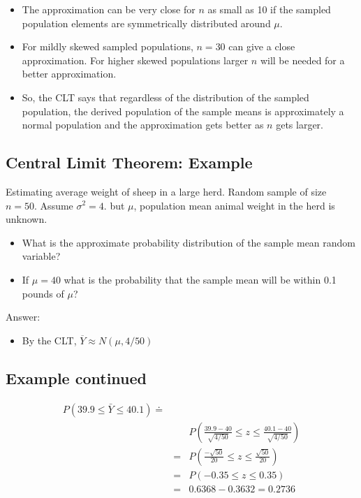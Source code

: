 \documentclass[
  letterpaper,
  DIV=11,
  numbers=noendperiod]{scrartcl}
\providecommand{\tightlist}{%
  \setlength{\itemsep}{0pt}\setlength{\parskip}{0pt}}\usepackage{longtable,booktabs,array}
\begin{document}
\begin{itemize}
\item
  The approximation can be very close for \(n\) as small as 10 if the
  sampled population elements are symmetrically distributed around
  \(\mu\).
\item
  For mildly skewed sampled populations, \(n=30\) can give a close
  approximation. For higher skewed populations larger \(n\) will be
  needed for a better approximation.
\item
  So, the CLT says that regardless of the distribution of the sampled
  population, the derived population of the sample means is
  approximately a normal population and the approximation gets better as
  \(n\) gets larger.
\end{itemize}

\subsection{Central Limit Theorem:
Example}\label{central-limit-theorem-example}

Estimating average weight of sheep in a large herd. Random sample of
size \(n=50\). Assume \(\sigma^2=4\). but \(\mu\), population mean
animal weight in the herd is unknown.

\begin{itemize}
\item
  What is the approximate probability distribution of the sample mean
  random variable?
\item
  If \(\mu=40\) what is the probability that the sample mean will be
  within 0.1 pounds of \(\mu\)?
\end{itemize}

Answer:

\begin{itemize}
\tightlist
\item
  By the CLT, \(\overline{Y} \approx N (\mu, 4/50)\)
\end{itemize}

\subsection{Example continued}\label{example-continued}

\[\begin{eqnarray*}
  {P(39.9 \leq \bar{Y} \leq 40.1)  \doteq }\\[.1in]
  & & P\left(\frac{39.9-40}{\sqrt{4/50}}\right. 
   \left.\leq z \leq \frac{40.1-40}{\sqrt{4/50}}\right) \\[.2in]
     & = & P\left(\frac{-\sqrt{50}}{20} \leq z \leq 
         \frac{\sqrt{50}}{20}\right) \\[.3in]
     & = & P\left(-0.35 \leq z \leq 0.35\right) \\[.3in]
        & = & 0.6368-0.3632=0.2736
  \end{eqnarray*}\]
\end{document}
